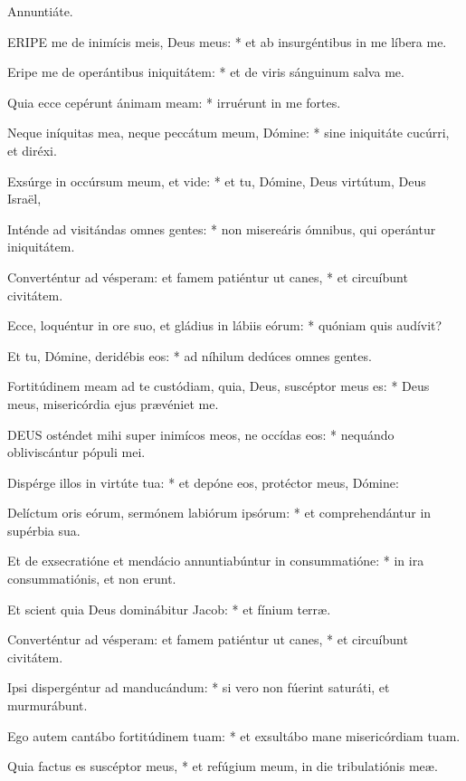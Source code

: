   Annuntiáte.


\lettrine[lines=2]{E}{RIPE} me de inimícis meis, Deus meus: * et ab insurgéntibus in me líbera me.

Eripe me de operántibus iniquitátem: * et de viris sánguinum salva me.

Quia ecce cepérunt ánimam meam: * irruérunt in me fortes.

Neque iníquitas mea, neque peccátum meum, Dómine: * sine iniquitáte cucúrri, et diréxi.

Exsúrge in occúrsum meum, et vide: * et tu, Dómine, Deus virtútum, Deus Israël,

Inténde ad visitándas omnes gentes: * non misereáris ómnibus, qui operántur iniquitátem.

Converténtur ad vésperam: et famem patiéntur ut canes, * et circuíbunt civitátem.

Ecce, loquéntur in ore suo, et gládius in lábiis eórum: * quóniam quis audívit?

Et tu, Dómine, deridébis eos: * ad níhilum dedúces omnes gentes.

Fortitúdinem meam ad te custódiam, quia, Deus, suscéptor meus es: * Deus meus, misericórdia ejus prævéniet me.


\lettrine[lines=2]{D}{EUS} osténdet mihi super inimícos meos, ne occídas eos: * nequándo obliviscántur pópuli mei.

Dispérge illos in virtúte tua: * et depóne eos, protéctor meus, Dómine:

Delíctum oris eórum, sermónem labiórum ipsórum: * et comprehendántur in supérbia sua.

Et de exsecratióne et mendácio annuntiabúntur in consummatióne: * in ira consummatiónis, et non erunt.

Et scient quia Deus dominábitur Jacob: * et fínium terræ.

Converténtur ad vésperam: et famem patiéntur ut canes, * et circuíbunt civitátem.

Ipsi dispergéntur ad manducándum: * si vero non fúerint saturáti, et murmurábunt.

Ego autem cantábo fortitúdinem tuam: * et exsultábo mane misericórdiam tuam.

Quia factus es suscéptor meus, * et refúgium meum, in die tribulatiónis meæ.

